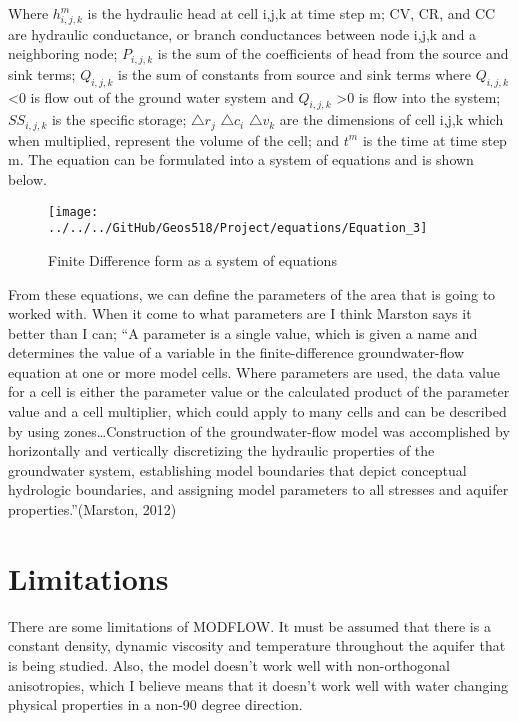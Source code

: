 \documentclass[]{report}
\begin{document}
Where $h^{m}_{i,j,k}$ is the hydraulic head at cell i,j,k at time step m; CV, CR, and CC are hydraulic conductance, or branch conductances between node i,j,k and a neighboring node; $P_{i,j,k}$ is the sum of the coefficients of head from the source and sink terms; $Q_{i,j,k}$ is the sum of constants from source and sink terms where $Q_{i,j,k}$\textless 0 is flow out of the ground water system and $Q_{i,j,k}$ \textgreater 0 is flow into the system; $SS_{i,j,k}$ is the specific storage; $\bigtriangleup r_{j}$ $\bigtriangleup c_{i}$ $\bigtriangleup v_{k}$ are the dimensions of cell i,j,k which when multiplied, represent the volume of the cell; and $t^{m}$ is the time at time step m. The equation can be formulated into a system of equations and is shown below. \\ 

\begin{figure}[h]
	\centering
	\texttt{[image: ../../../GitHub/Geos518/Project/equations/Equation\_3]}
	\caption{Finite Difference form as a system of equations}
\end{figure}


From these equations, we can define the parameters of the area that is going to worked with. When it come to what parameters are I think Marston says it better than I can; “A parameter is a single value, which is given a name and determines the value of a variable in the finite-difference groundwater-flow equation at one or more model cells. Where parameters are used, the data value for a cell is either the parameter value or the calculated product of the parameter value and a cell multiplier, which could apply to many cells and can be described by using zones…Construction of the groundwater-flow model was accomplished by horizontally and vertically discretizing the hydraulic properties of the groundwater system, establishing model boundaries that depict conceptual hydrologic boundaries, and assigning model parameters to all stresses and aquifer properties.”(Marston, 2012)\\
\section{Limitations}
There are some limitations of MODFLOW. It must be assumed that there is a constant density, dynamic viscosity and temperature throughout the aquifer that is being studied. Also, the model doesn’t work well with non-orthogonal anisotropies, which I believe means that it doesn’t work well with water changing physical properties in a non-90 degree direction. \\
\end{document}
